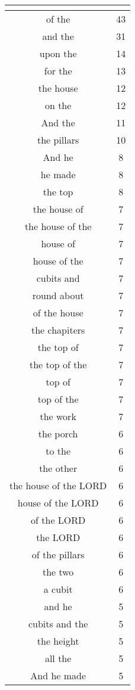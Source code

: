 \begin{center}
\begin{longtable}{|c|c|}
\hline \multicolumn{2}{c}{{ }} \\ \hline
\endfoot 
of the & 43\\ \hline 
and the & 31\\ \hline 
upon the & 14\\ \hline 
for the & 13\\ \hline 
the house & 12\\ \hline 
on the & 12\\ \hline 
And the & 11\\ \hline 
the pillars & 10\\ \hline 
And he & 8\\ \hline 
he made & 8\\ \hline 
the top & 8\\ \hline 
the house of & 7\\ \hline 
the house of the & 7\\ \hline 
house of & 7\\ \hline 
house of the & 7\\ \hline 
cubits and & 7\\ \hline 
round about & 7\\ \hline 
of the house & 7\\ \hline 
the chapiters & 7\\ \hline 
the top of & 7\\ \hline 
the top of the & 7\\ \hline 
top of & 7\\ \hline 
top of the & 7\\ \hline 
the work & 7\\ \hline 
the porch & 6\\ \hline 
to the & 6\\ \hline 
the other & 6\\ \hline 
the house of the LORD & 6\\ \hline 
house of the LORD & 6\\ \hline 
of the LORD & 6\\ \hline 
the LORD & 6\\ \hline 
of the pillars & 6\\ \hline 
the two & 6\\ \hline 
a cubit & 6\\ \hline 
and he & 5\\ \hline 
cubits and the & 5\\ \hline 
the height & 5\\ \hline 
all the & 5\\ \hline 
And he made & 5\\ \hline 

\end{longtable}
\end{center}
